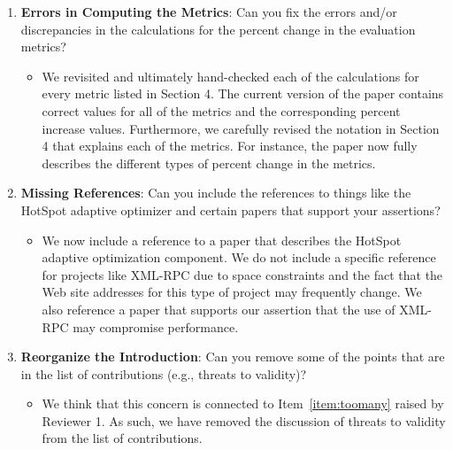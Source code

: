 \documentclass[11pt]{article}
\begin{document}
\begin{enumerate}
\begin{itemize}
    \end{itemize}

  \item {\bf Errors in Computing the Metrics}: Can you fix the errors
    and/or discrepancies in the calculations for the percent change in
    the evaluation metrics?

    \begin{itemize}

      \item We revisited and ultimately hand-checked each of the
        calculations for every metric listed in Section 4.  The
        current version of the paper contains correct values for all
        of the metrics and the corresponding percent increase values.
        Furthermore, we carefully revised the notation in Section 4
        that explains each of the metrics.  For instance, the paper
        now fully describes the different types of percent change in
        the metrics.


    \end{itemize}

  \item {\bf Missing References}: Can you include the references to
    things like the HotSpot adaptive optimizer and certain papers that
    support your assertions?

    \begin{itemize}

      \item We now include a reference to a paper that describes the
        HotSpot adaptive optimization component. We do not include a
        specific reference for projects like XML-RPC due to space
        constraints and the fact that the Web site addresses for this
        type of project may frequently change.  We also reference a
        paper that supports our assertion that the use of XML-RPC may
        compromise performance.

    \end{itemize}

\newpage

  \item {\bf Reorganize the Introduction}: Can you remove some of the
    points that are in the list of contributions (e.g., threats to
    validity)?

    \begin{itemize}

      \item We think that this concern is connected to
        Item~\ref{item:toomany} raised by Reviewer 1.  As such, we
        have removed the discussion of threats to validity from the
        list of contributions.


\end{itemize}
\end{enumerate}
\end{document}
